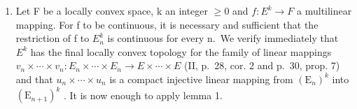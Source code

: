 \begin{enumerate}
\def\labelenumi{\arabic{enumi})}
\setcounter{enumi}{1}
\tightlist
\item
  Let F be a locally convex space, k an integer \(\geqslant0\) and \(f:E^{k}\rightarrow F\) a multilinear mapping. For f to be continuous, it is necessary and sufficient that the restriction of f to \(E_{n}^{k}\) is continuous for every n.~We verify immediately that \(E^{k}\) has the final locally convex topology for the family of linear mappings \(v_{n}\times\cdots\times v_{n}:E_{n}\times\cdots\times E_{n}\to E\times\cdots\times E\) (II, p.~28, cor. 2 and p.~30, prop. 7) and that \(u_{n}\times\cdots\times u_{n}\) is a compact injective linear mapping from \((\mathrm{E}_{n})^{k}\) into \((\mathrm{E}_{n+1})^{k}\) . It is now enough to apply lemma 1.
\end{enumerate}
\relax{}
